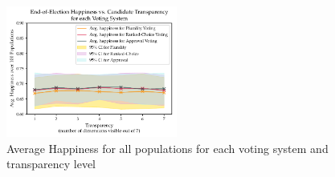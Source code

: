 \begin{figure}[h!]
\includegraphics[width=0.5\textwidth]{../src/figs/uniform_opinions/avghapp_transparency.pdf}
\caption{Average Happiness for all populations for each voting system and transparency level}
\label{fig:avghapp_by_transparency}
\end{figure}
